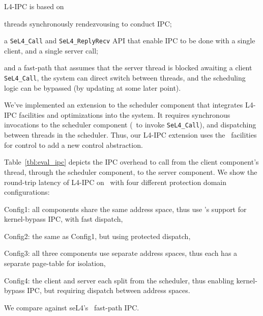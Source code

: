 L4-IPC is based on
\begin{inparaenum}[(1)]
\item threads synchronously rendezvousing to conduct IPC;
\item a {\tt SeL4\_Call} and {\tt SeL4\_ReplyRecv} API that enable IPC to be done with a single client, and a single server call;
\item and a fast-path that assumes that the server thread is blocked awaiting a client {\tt SeL4\_Call}, the system can direct switch between threads, and the scheduling logic can be bypassed (by updating at some later point).
\end{inparaenum}
We've implemented an extension to the scheduler component that integrates L4-IPC facilities and optimizations into the system.
It requires synchronous invocations to the scheduler component (\eg\ to invoke {\tt SeL4\_Call}), and dispatching between threads in the scheduler.
Thus, our L4-IPC extension uses the \name\ facilities for control to add a new control abstraction.

Table~\ref{tbl:eval_ipc} depicts the IPC overhead to call from the client component's thread, through the scheduler component, to the server component.
We show the round-trip latency of L4-IPC on \name\ with four different protection domain configurations:
\begin{inparaenum}[(1)]
\item Config1: all components share the same address space, thus use \name's support for kernel-bypass IPC, with fast dispatch,
\item Config2: the same as Config1, but using protected dispatch,
\item Config3: all three components use separate address spaces, thus each has a separate page-table for isolation,
\item Config4: the client and server each split from the scheduler, thus enabling kernel-bypass IPC, but requiring dispatch between address spaces.
\end{inparaenum}
We compare against seL4's~\cite{sel4} fast-path IPC.

